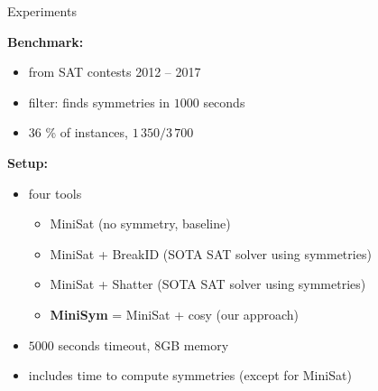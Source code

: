 \documentclass{beamer}
\begin{document}
\begin{frame}{Experiments}

\textbf{Benchmark:}
\begin{itemize}
	\item from SAT contests 2012 -- 2017
	\item filter: \bliss{} finds symmetries in $1000$ seconds
	\item 36 \% of instances, $1\,350 / 3\,700$
\end{itemize}
\vfill
\textbf{Setup:}
\begin{itemize}
	\item four tools
	\begin{itemize}
		\item MiniSat (no symmetry, baseline)
		\item MiniSat + BreakID (SOTA SAT solver using symmetries)
		\item MiniSat + Shatter (SOTA SAT solver using symmetries)
		\item \textbf{MiniSym} = MiniSat + cosy (our approach)
	\end{itemize}
	\item $5000$ seconds timeout, $8$GB memory
	\item includes time to compute symmetries (except for MiniSat)
\end{itemize}

\end{frame}
\end{document}
